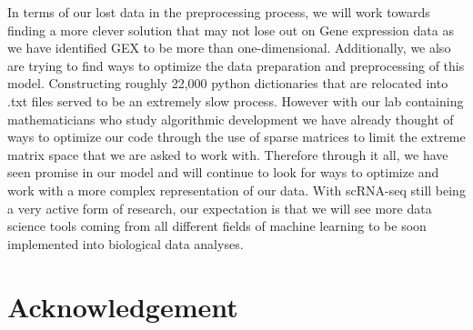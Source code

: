 In terms of our lost data in the preprocessing process, we will work towards finding a more clever solution that may not lose out on Gene expression data as we have identified GEX to be more than one-dimensional. Additionally, we also are trying to find ways to optimize the data preparation and preprocessing of this model. Constructing roughly 22,000 python dictionaries that are relocated into .txt files served to be an extremely slow process. However with our lab containing mathematicians who study algorithmic development we have already thought of ways to optimize our code through the use of sparse matrices to limit the extreme matrix space that we are asked to work with. Therefore through it all, we have seen promise in our model and will continue to look for ways to optimize and work with a more complex representation of our data. With scRNA-seq still being a very active form of research, our expectation is that we will see more data science tools coming from all different fields of machine learning to be soon implemented into biological data analyses.

\section{Acknowledgement}



